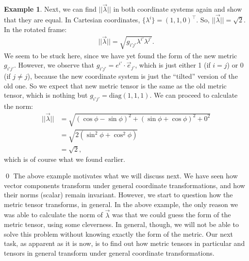 \documentclass{book}
\theoremstyle{definition}
\newtheorem{exmp}{Example}[section]
\begin{document}
\begin{exmp}
	Next, we can find $\vert\vert \vec{\lambda} \vert\vert$ in both coordinate systems again and show that they are equal. In Cartesian coordinates, $\{\lambda^i\} = (1,1,0)^\top$. So, $\vert\vert \vec{\lambda} \vert\vert = \sqrt{2}$. In the rotated frame:
	\begin{align*}
	\vert\vert\vec{\lambda}\vert\vert = \sqrt{g_{i'j'}\lambda^{i'}\lambda^{j'}}.
	\end{align*}
	We seem to be stuck here, since we have yet found the form of the new metric $g_{i'j'}$. However, we observe that $g_{i'j'} = e^{i'}\cdot\vec{e}_{j'}$, which is just either 1 (if $i=j$) or 0 (if $j\neq j$), because the new coordinate system is just the ``tilted'' version of the old one. So we expect that new metric tensor is the same as the old metric tensor, which is nothing but $g_{i'j'}=\text{diag}(1,1,1)$. We can proceed to calculate the norm:
	\begin{align*}
	\vert\vert\vec{\lambda}\vert\vert &= \sqrt{\left( \cos\phi - \sin\phi \right)^2 + \left( \sin\phi + \cos\phi \right)^2 + 0^2}\\
	&= \sqrt{2\left(\sin^2\phi + \cos^2\phi\right) }\\
	&= \sqrt{2},
	\end{align*}
	which is of course what we found earlier. 
\end{exmp}\qed
The above example motivates what we will discuss next. We have seen how vector components transform under general coordinate transformations, and how their norms (scalar) remain invariant. However, we start to question how the metric tensor transforms, in general. In the above example, the only reason we was able to calculate the norm of $\vec{\lambda}$ was that we could guess the form of the metric tensor, using some cleverness. In general, though, we will not be able to solve this problem without knowing exactly the form of the metric. Our next task, as apparent as it is now, is to find out how metric tensors in particular and tensors in general transform under general coordinate transformations. 
\end{document}
